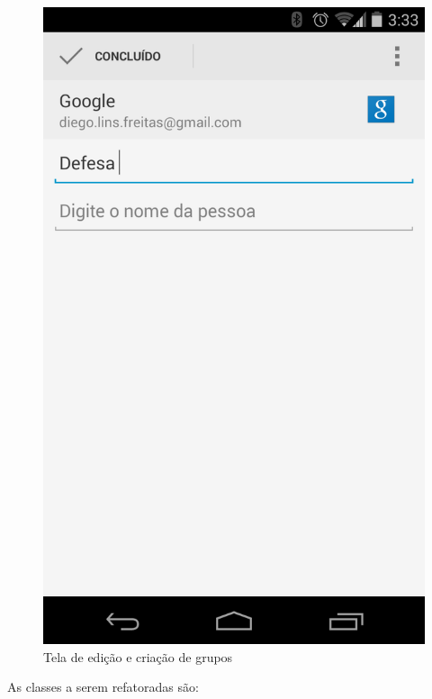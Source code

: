 \documentclass[conference]{IEEEtran}
\begin{document}
\begin{figure}[htb]
\begin{minipage}[b]{0.45\linewidth}
	\end{minipage}
\quad
	\begin{minipage}[b]{0.45\linewidth}
		\begin{center} 
			\includegraphics[scale=0.10]{img/contacts_edit.png}
		\end{center}
		\caption{\label{fig:groups_edit} Tela de edição e criação de grupos}
		 
	\end{minipage}
\end{figure}


As classes a serem refatoradas são:
\end{document}
